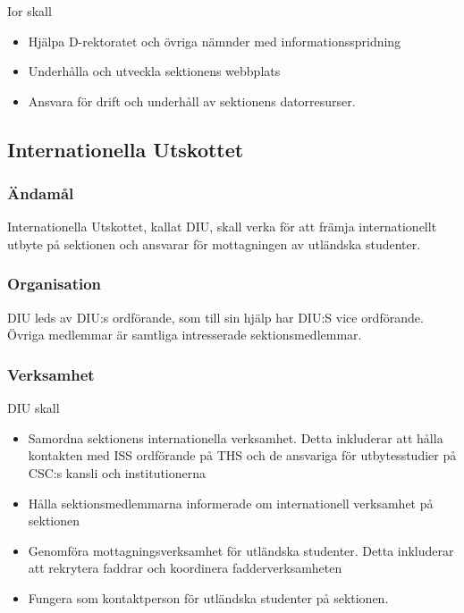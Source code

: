 \documentclass[a4paper,12pt]{article}
\begin{document}
Ior skall

\begin{itemize}
  \item Hjälpa D-rektoratet och övriga nämnder med informationsspridning
  \item Underhålla och utveckla sektionens webbplats
  \item Ansvara för drift och underhåll av sektionens datorresurser.
\end{itemize}

\subsection{Internationella Utskottet}

\subsubsection{Ändamål}

Internationella Utskottet, kallat DIU, skall verka för att främja internationellt utbyte på sektionen och ansvarar för mottagningen av utländska studenter.

\subsubsection{Organisation}

DIU leds av DIU:s ordförande, som till sin hjälp har DIU:S vice ordförande. Övriga medlemmar är samtliga intresserade sektionsmedlemmar.

\subsubsection{Verksamhet}

DIU skall

\begin{itemize}
  \item Samordna sektionens internationella verksamhet. Detta inkluderar att hålla kontakten med ISS ordförande på THS och de ansvariga för utbytesstudier på CSC:s kansli och institutionerna
  \item Hålla sektionsmedlemmarna informerade om internationell verksamhet på sektionen
  \item Genomföra mottagningsverksamhet för utländska studenter. Detta inkluderar att rekrytera faddrar och koordinera fadderverksamheten
  \item Fungera som kontaktperson för utländska studenter på sektionen.
\end{itemize}
\end{document}
